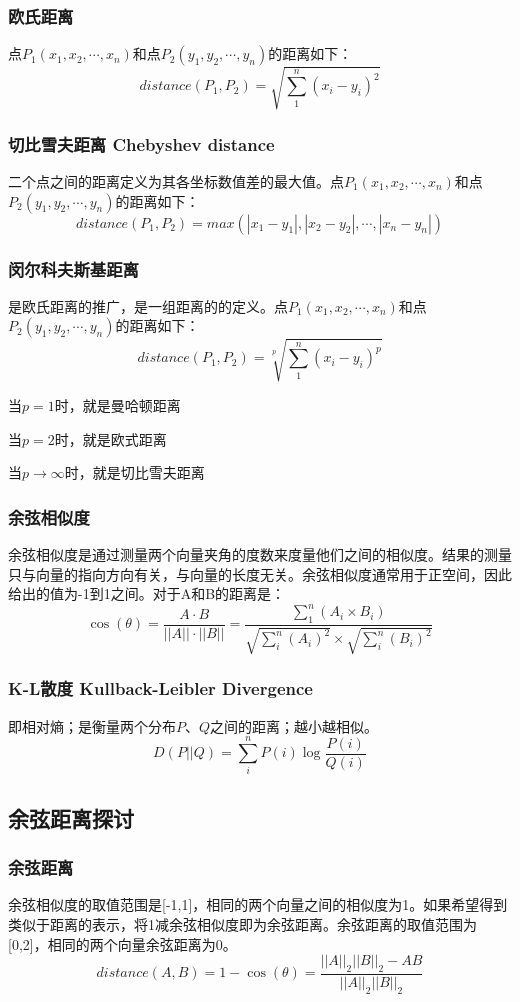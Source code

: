 \documentclass[12pt]{article}
\begin{document}
\subsubsection{欧氏距离}
点$P_1(x_1, x_2, \cdots, x_n)$和点$P_2(y_1, y_2, \cdots, y_n)$的距离如下：
$$
distance(P_1, P_2) = \sqrt{\sum_1^n(x_i-y_i)^2}
$$

\subsubsection{切比雪夫距离 Chebyshev distance}
二个点之间的距离定义为其各坐标数值差的最大值。点$P_1(x_1, x_2, \cdots, x_n)$和点$P_2(y_1, y_2, \cdots, y_n)$的距离如下：
$$
distance(P_1, P_2) = max(|x_1-y_1|, |x_2-y_2|, \cdots,|x_n-y_n|)
$$

\subsubsection{闵尔科夫斯基距离}
是欧氏距离的推广，是一组距离的的定义。点$P_1(x_1, x_2, \cdots, x_n)$和点$P_2(y_1, y_2, \cdots, y_n)$的距离如下：
$$
distance(P_1, P_2) = \sqrt[p]{\sum_1^n(x_i-y_i)^p}
$$

当$p=1$时，就是曼哈顿距离

当$p=2$时，就是欧式距离

当$p\rightarrow \infty$时，就是切比雪夫距离

\subsubsection{余弦相似度}
余弦相似度是通过测量两个向量夹角的度数来度量他们之间的相似度。结果的测量只与向量的指向方向有关，与向量的长度无关。余弦相似度通常用于正空间，因此给出的值为-1到1之间。对于A和B的距离是：
$$
\cos(\theta) = \frac{A\cdot B}{||A||\cdot||B||} = \frac{\sum_1^n(A_i \times B_i)}{\sqrt{\sum_i^n(A_i)^2} \times \sqrt{\sum_i^n(B_i)^2}}
$$

\subsubsection{K-L散度 Kullback-Leibler Divergence}
即相对熵；是衡量两个分布$P$、$Q$之间的距离；越小越相似。
$$
D(P||Q) = \sum_i^nP(i) \log{\frac{P(i)}{Q(i)}}
$$

\subsection{余弦距离探讨\cite{Cosine_Distance}}
\subsubsection{余弦距离}
余弦相似度的取值范围是[-1,1]，相同的两个向量之间的相似度为1。如果希望得到类似于距离的表示，将1减余弦相似度即为余弦距离。余弦距离的取值范围为[0,2]，相同的两个向量余弦距离为0。
$$
distance(A,B) = 1 - \cos(\theta) = \frac{||A||_2||B||_2 - AB}{||A||_2||B||_2}
$$
\end{document}
